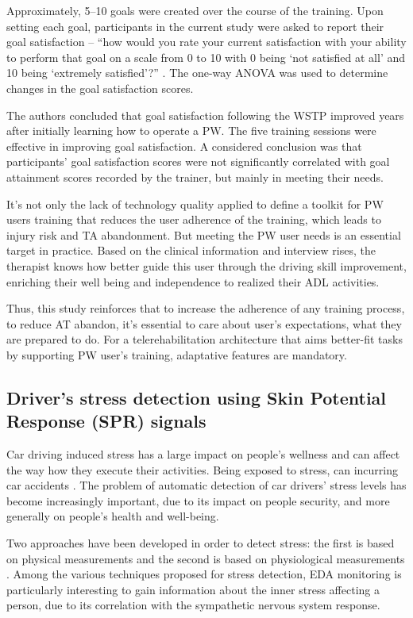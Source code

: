 Approximately, 5–10 goals were created over the course of the training. Upon setting each goal, participants in the current study were asked to report their goal satisfaction – ``how would you rate your current satisfaction with your ability to perform that goal on a scale from 0 to 10 with 0 being ‘not satisfied at all’ and 10 being ‘extremely satisfied’?'' \cite{mortenson2007}.  The one-way ANOVA was used to determine changes in the goal satisfaction scores.

The authors concluded that goal satisfaction following the WSTP improved years after initially learning how to operate a PW. The five training sessions were effective in improving goal satisfaction. A considered conclusion was that participants’ goal satisfaction scores were not significantly correlated with goal attainment scores recorded by the trainer, but mainly in meeting their needs.

It's not only the lack of technology quality applied to define a toolkit for PW users training that reduces the user adherence of the training, which leads to injury risk and TA abandonment. But meeting the PW user needs is an essential target in practice. Based on the clinical information and interview rises, the therapist knows how better guide this user through the driving skill improvement, enriching their well being and independence to realized their ADL activities. 

Thus, this study reinforces that to increase the adherence of any training process, to reduce AT abandon, it's essential to care about user's expectations, what they are prepared to do. For a telerehabilitation architecture that aims better-fit tasks by supporting PW user's training, adaptative features are mandatory.  


\subsection{Driver's stress detection using Skin Potential Response (SPR) signals}
\label{sec:stressSPR}
Car driving induced stress has a large impact on people’s wellness and can affect the way how they execute their activities. Being exposed to stress, can incurring car accidents \cite{zheng2015}.  The problem of automatic detection of car drivers’ stress levels has become increasingly important, due to its impact on people security, and more generally on people's health and well-being. 

Two approaches have been developed in order to detect stress: the first is based on physical measurements and the second is based on physiological measurements \cite{greene2016}. Among the various techniques proposed for stress detection, EDA monitoring is particularly interesting to gain information about the inner stress affecting a person, due to its correlation with the sympathetic nervous system response. 

